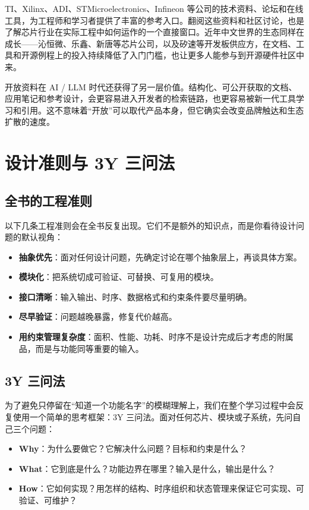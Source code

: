 \documentclass[11pt,a4paper]{article}
\begin{document}
TI、Xilinx、ADI、STMicroelectronics、Infineon 等公司的技术资料、论坛和在线工具，为工程师和学习者提供了丰富的参考入口。翻阅这些资料和社区讨论，也是了解芯片行业在实际工程中如何运作的一个直接窗口。近年中文世界的生态同样在成长——沁恒微、乐鑫、新唐等芯片公司，以及矽速等开发板供应方，在文档、工具和开源例程上的投入持续降低了入门门槛，也让更多人能参与到开源硬件社区中来。

开放资料在 AI / LLM 时代还获得了另一层价值。结构化、可公开获取的文档、应用笔记和参考设计，会更容易进入开发者的检索链路，也更容易被新一代工具学习和引用。这不意味着``开放''可以取代产品本身，但它确实会改变品牌触达和生态扩散的速度。

\section{设计准则与 3Y 三问法}

\subsection{全书的工程准则}

以下几条工程准则会在全书反复出现。它们不是额外的知识点，而是你看待设计问题的默认视角：

\begin{itemize}
  \item \textbf{抽象优先}：面对任何设计问题，先确定讨论在哪个抽象层上，再谈具体方案。
  \item \textbf{模块化}：把系统切成可验证、可替换、可复用的模块。
  \item \textbf{接口清晰}：输入输出、时序、数据格式和约束条件要尽量明确。
  \item \textbf{尽早验证}：问题越晚暴露，修复代价越高。
  \item \textbf{用约束管理复杂度}：面积、性能、功耗、时序不是设计完成后才考虑的附属品，而是与功能同等重要的输入。
\end{itemize}

\subsection{3Y 三问法}

为了避免只停留在``知道一个功能名字''的模糊理解上，我们在整个学习过程中会反复使用一个简单的思考框架：3Y 三问法。面对任何芯片、模块或子系统，先问自己三个问题：

\begin{itemize}
  \item \textbf{Why}：为什么要做它？它解决什么问题？目标和约束是什么？
  \item \textbf{What}：它到底是什么？功能边界在哪里？输入是什么，输出是什么？
  \item \textbf{How}：它如何实现？用怎样的结构、时序组织和状态管理来保证它可实现、可验证、可维护？
\end{itemize}
\end{document}
